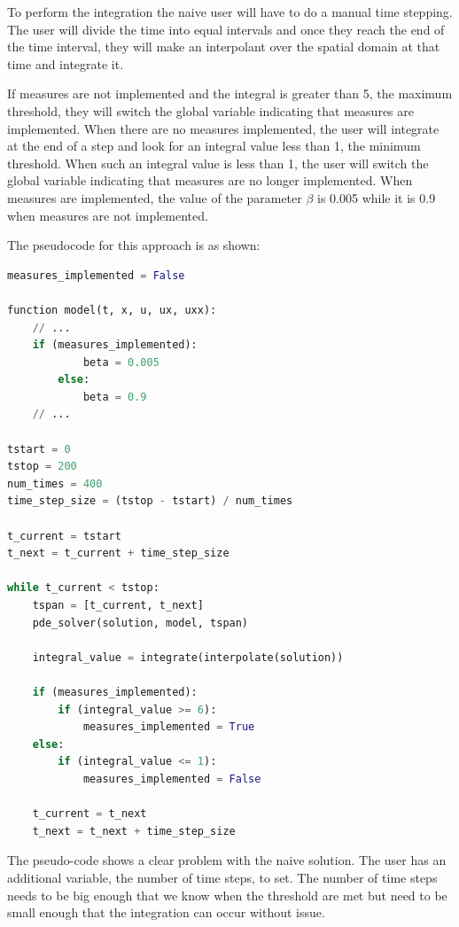 \documentclass{article}
\begin{document}
To perform the integration the naive user will have to do a manual time stepping. The user will divide the time into equal intervals and once they reach the end of the time interval, they will make an interpolant over the spatial domain at that time and integrate it. 

If measures are not implemented and the integral is greater than 5, the maximum threshold, they will switch the global variable indicating that measures are implemented. When there are no measures implemented, the user will integrate at the end of a step and look for an integral value less than 1, the minimum threshold. When such an integral value is less than 1, the user will switch the global variable indicating that measures are no longer implemented. When measures are implemented, the value of the parameter $\beta$ is 0.005 while it is 0.9 when measures are not implemented. 

The pseudocode for this approach is as shown:

\begin{minipage}{\linewidth}
\begin{lstlisting}[language=Python]
measures_implemented = False

function model(t, x, u, ux, uxx):
    // ...
    if (measures_implemented):
    		beta = 0.005
    	else:
    		beta = 0.9
    // ...

tstart = 0
tstop = 200
num_times = 400
time_step_size = (tstop - tstart) / num_times
		
t_current = tstart
t_next = t_current + time_step_size

while t_current < tstop:
	tspan = [t_current, t_next]
	pde_solver(solution, model, tspan)
	
	integral_value = integrate(interpolate(solution))
	
	if (measures_implemented):
		if (integral_value >= 6):
			measures_implemented = True
	else:
		if (integral_value <= 1):
			measures_implemented = False
	
	t_current = t_next
	t_next = t_next + time_step_size
\end{lstlisting}
\end{minipage}

The pseudo-code shows a clear problem with the naive solution. The user has an additional variable, the number of time steps, to set. The number of time steps needs to be big enough that we know when the threshold are met but need to be small enough that the integration can occur without issue. 
\end{document}

